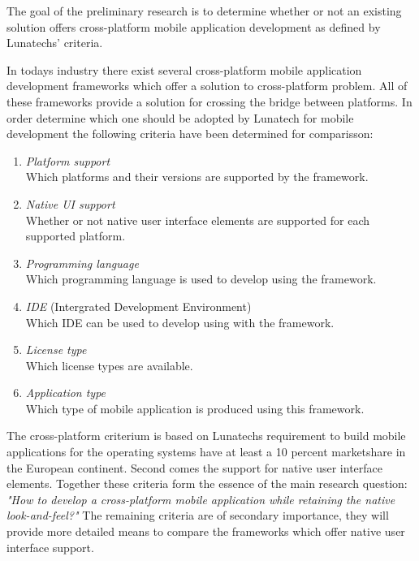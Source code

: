 
The goal of the preliminary research is to determine whether or not an existing solution offers cross-platform mobile application development as defined by Lunatechs' criteria.


In todays industry there exist several cross-platform mobile application development frameworks which offer a solution to cross-platform problem. All of these frameworks provide a solution for crossing the bridge between platforms. In order determine which one should be adopted by Lunatech for mobile development the following criteria have been determined for comparisson:

\begin{enumerate}
\item \emph{Platform support}\\
Which platforms and their versions are supported by the framework.
\item \emph{Native UI support}\\
Whether or not native user interface elements are supported for each supported platform.
\item \emph{Programming language}\\
Which programming language is used to develop using the framework.
\item \emph{IDE} (Intergrated Development Environment)\\
Which IDE can be used to develop using with the framework.
\item \emph{License type}\\
Which license types are available.
\item \emph{Application type}\\
Which type of mobile application is produced using this framework.
\end{enumerate}

The cross-platform criterium is based on Lunatechs requirement to build mobile applications for the operating systems have at least a 10 percent marketshare in the European continent. Second comes the support for native user interface elements. Together these criteria form the essence of the main research question: \emph{"How to develop a cross-platform mobile application while retaining the native look-and-feel?"}
The remaining criteria are of secondary importance, they will provide more detailed means to compare the frameworks which offer native user interface support.


